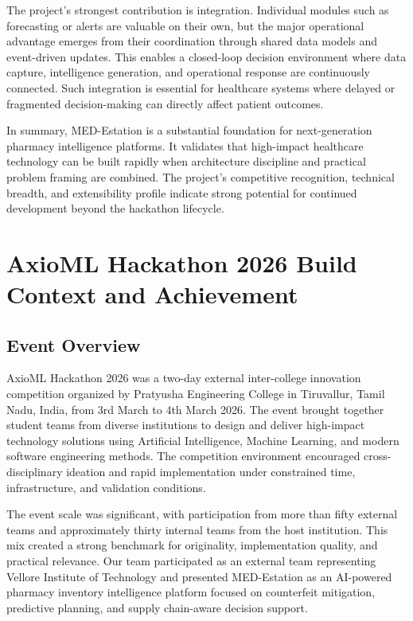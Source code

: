 \documentclass[12pt,a4paper]{report}
\begin{document}
The project’s strongest contribution is integration. Individual modules such as forecasting or alerts are valuable on their own, but the major operational advantage emerges from their coordination through shared data models and event-driven updates. This enables a closed-loop decision environment where data capture, intelligence generation, and operational response are continuously connected. Such integration is essential for healthcare systems where delayed or fragmented decision-making can directly affect patient outcomes.

In summary, MED-Estation is a substantial foundation for next-generation pharmacy intelligence platforms. It validates that high-impact healthcare technology can be built rapidly when architecture discipline and practical problem framing are combined. The project’s competitive recognition, technical breadth, and extensibility profile indicate strong potential for continued development beyond the hackathon lifecycle.

\appendix
\chapter{AxioML Hackathon 2026 Build Context and Achievement}
\section*{Event Overview}
AxioML Hackathon 2026 was a two-day external inter-college innovation competition organized by Pratyusha Engineering College in Tiruvallur, Tamil Nadu, India, from 3rd March to 4th March 2026. The event brought together student teams from diverse institutions to design and deliver high-impact technology solutions using Artificial Intelligence, Machine Learning, and modern software engineering methods. The competition environment encouraged cross-disciplinary ideation and rapid implementation under constrained time, infrastructure, and validation conditions.

The event scale was significant, with participation from more than fifty external teams and approximately thirty internal teams from the host institution. This mix created a strong benchmark for originality, implementation quality, and practical relevance. Our team participated as an external team representing Vellore Institute of Technology and presented MED-Estation as an AI-powered pharmacy inventory intelligence platform focused on counterfeit mitigation, predictive planning, and supply chain-aware decision support.
\end{document}
